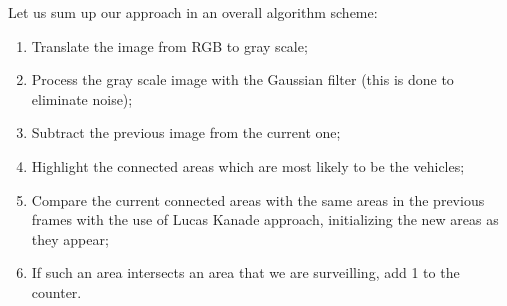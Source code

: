 \documentclass[12pt,a4paper,oneside,titlepage]{article}
\begin{document}
Let us sum up our approach in an overall algorithm scheme:
\begin{enumerate}
	\item Translate the image from RGB to gray scale;
	\item Process the gray scale image with the Gaussian filter (this is done to eliminate noise);
	\item Subtract the previous image from the current one;
	\item Highlight the connected areas which are most likely to be the vehicles;
	\item Compare the current connected areas with the same areas in the previous frames with the use of Lucas Kanade approach, initializing the new areas as they appear;
	\item If such an area intersects an area that we are surveilling, add 1 to the counter.
\end{enumerate}
\end{document}
